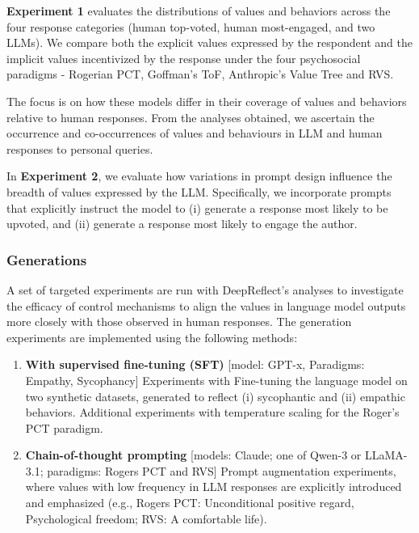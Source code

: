 \textbf{Experiment 1} evaluates the distributions of values and behaviors across the four response categories (human top-voted, human most-engaged, and two LLMs). We compare both the explicit values expressed by the respondent and the implicit values incentivized by the response under the four psychosocial paradigms - Rogerian PCT, Goffman’s ToF, Anthropic’s Value Tree and RVS.


The focus is on how these models differ in their coverage of values and behaviors relative to human responses. From the analyses obtained, we ascertain the occurrence and co-occurrences of values and behaviours in LLM and human responses to personal queries.


In \textbf{Experiment 2}, we evaluate how variations in prompt design influence the breadth of values expressed by the LLM. Specifically, we incorporate prompts that explicitly instruct the model to (i) generate a response most likely to be upvoted, and (ii) generate a response most likely to engage the author.


\subsubsection{Generations}
A set of targeted experiments are run with DeepReflect’s analyses to investigate the efficacy of control mechanisms to align the values in language model outputs more closely with those observed in human responses. The generation experiments are implemented using the following methods:

\begin{enumerate}
    \item \textbf{With supervised fine-tuning (SFT)} [model: GPT-x, Paradigms: Empathy, Sycophancy]
Experiments with Fine-tuning the language model on two synthetic datasets, generated to reflect (i) sycophantic and (ii) empathic behaviors.
Additional experiments with temperature scaling for the Roger's PCT paradigm.

    \item \textbf{Chain-of-thought prompting} [models: Claude; one of Qwen-3 or LLaMA-3.1; paradigms: Rogers PCT and RVS]
Prompt augmentation experiments, where values with low frequency in LLM responses are explicitly introduced and emphasized (e.g., Rogers PCT: Unconditional positive regard, Psychological freedom; RVS: A comfortable life).
\end{enumerate}

    
